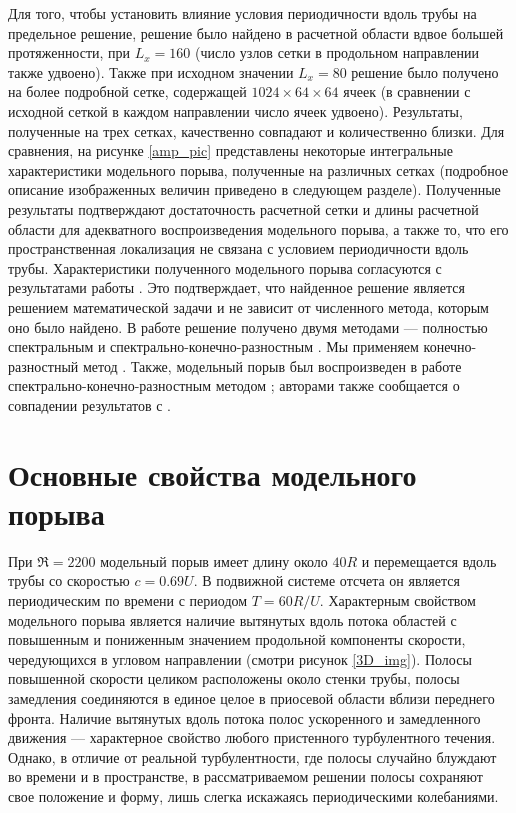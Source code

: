 Для того, чтобы установить влияние условия периодичности вдоль трубы на предельное решение, решение было найдено в расчетной области вдвое большей протяженности, при $L_x = 160$ (число узлов сетки в продольном направлении также удвоено). Также при исходном значении $L_x = 80$ решение было получено на более подробной сетке, содержащей $1024 \times 64 \times 64$ ячеек (в сравнении с исходной сеткой в каждом направлении число ячеек удвоено). Результаты, полученные на трех сетках, качественно совпадают и количественно близки. Для сравнения, на рисунке \ref{amp_pic} представлены некоторые интегральные характеристики модельного порыва, полученные на различных сетках (подробное описание изображенных величин приведено в следующем разделе). Полученные результаты подтверждают достаточность расчетной сетки и длины расчетной области для адекватного воспроизведения модельного порыва, а также то, что его пространственная локализация не связана с условием периодичности вдоль трубы. Характеристики полученного модельного порыва согласуются с результатами работы \cite{Avila2013}. Это подтверждает, что найденное решение является решением математической задачи и не зависит от численного метода, которым оно было найдено. В работе \cite{Avila2013} решение получено двумя методами --- полностью спектральным \cite{Meseguer2007} и спектрально-конечно-разностным \cite{Willis2009}. Мы применяем конечно-разностный метод \cite{Nikitin2006}. Также, модельный порыв был воспроизведен в работе \cite{Chantry2014} спектрально-конечно-разностным методом \cite{Willis2009}; авторами также сообщается о совпадении результатов с \cite{Avila2013}. 


\section{Основные свойства модельного порыва}

При $\Re=2200$ модельный порыв имеет длину около $40R$ и перемещается вдоль трубы со скоростью $c = 0.69U$. В подвижной системе отсчета он является периодическим по времени с периодом $T = 60 R/U$. Характерным свойством модельного порыва является наличие вытянутых вдоль потока областей с повышенным и пониженным значением продольной компоненты скорости, чередующихся в угловом направлении (смотри рисунок \ref{3D_img}). Полосы повышенной скорости целиком расположены около стенки трубы, полосы замедления соединяются в единое целое в приосевой области вблизи переднего фронта. Наличие вытянутых вдоль потока полос ускоренного и замедленного движения --- характерное свойство любого пристенного турбулентного течения. Однако, в отличие от реальной турбулентности, где полосы случайно блуждают во времени и в пространстве, в рассматриваемом решении полосы сохраняют свое положение и форму, лишь слегка искажаясь периодическими колебаниями. 

